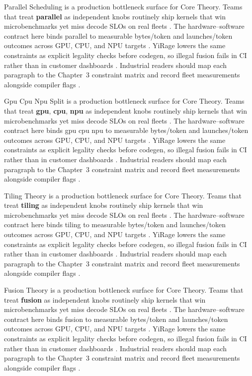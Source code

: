 Parallel Scheduling is a production bottleneck surface for Core Theory. Teams that treat \textbf{parallel} as independent knobs routinely ship kernels that win microbenchmarks yet miss decode SLOs on real fleets \citep{amd2024aie,kwon2023vllm}. The hardware--software contract here binds parallel to measurable bytes/token and launches/token outcomes across GPU, CPU, and NPU targets \citep{dlbook,nvidia2024cudagraphs}. YiRage lowers the same constraints as explicit legality checks before codegen, so illegal fusion fails in CI rather than in customer dashboards \citep{dao2022flashattention,liu2024deepseekv3}. Industrial readers should map each paragraph to the Chapter~3 constraint matrix and record fleet measurements alongside compiler flags \citep{kwon2023vllm,patel2025llminference}.

Gpu Cpu Npu Split is a production bottleneck surface for Core Theory. Teams that treat \textbf{gpu}, \textbf{cpu}, \textbf{npu} as independent knobs routinely ship kernels that win microbenchmarks yet miss decode SLOs on real fleets \citep{dlbook,nvidia2024cudagraphs}. The hardware--software contract here binds gpu cpu npu to measurable bytes/token and launches/token outcomes across GPU, CPU, and NPU targets \citep{dao2022flashattention,liu2024deepseekv3}. YiRage lowers the same constraints as explicit legality checks before codegen, so illegal fusion fails in CI rather than in customer dashboards \citep{kwon2023vllm,patel2025llminference}. Industrial readers should map each paragraph to the Chapter~3 constraint matrix and record fleet measurements alongside compiler flags \citep{nvidia2024cudagraphs,taxbreak2026}.

Tiling Theory is a production bottleneck surface for Core Theory. Teams that treat \textbf{tiling} as independent knobs routinely ship kernels that win microbenchmarks yet miss decode SLOs on real fleets \citep{dao2022flashattention,liu2024deepseekv3}. The hardware--software contract here binds tiling to measurable bytes/token and launches/token outcomes across GPU, CPU, and NPU targets \citep{kwon2023vllm,patel2025llminference}. YiRage lowers the same constraints as explicit legality checks before codegen, so illegal fusion fails in CI rather than in customer dashboards \citep{nvidia2024cudagraphs,taxbreak2026}. Industrial readers should map each paragraph to the Chapter~3 constraint matrix and record fleet measurements alongside compiler flags \citep{liu2024deepseekv3,memoryfloor2026}.

Fusion Theory is a production bottleneck surface for Core Theory. Teams that treat \textbf{fusion} as independent knobs routinely ship kernels that win microbenchmarks yet miss decode SLOs on real fleets \citep{kwon2023vllm,patel2025llminference}. The hardware--software contract here binds fusion to measurable bytes/token and launches/token outcomes across GPU, CPU, and NPU targets \citep{nvidia2024cudagraphs,taxbreak2026}. YiRage lowers the same constraints as explicit legality checks before codegen, so illegal fusion fails in CI rather than in customer dashboards \citep{liu2024deepseekv3,memoryfloor2026}. Industrial readers should map each paragraph to the Chapter~3 constraint matrix and record fleet measurements alongside compiler flags \citep{patel2025llminference,nvidia2022hopper}.

